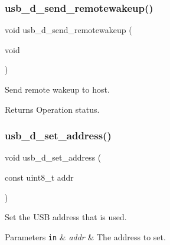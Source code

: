 \subsubsection{\texorpdfstring{usb\+\_\+d\+\_\+send\+\_\+remotewakeup()}{usb\_d\_send\_remotewakeup()}}
{\footnotesize\ttfamily void usb\+\_\+d\+\_\+send\+\_\+remotewakeup (\begin{DoxyParamCaption}\item[{void}]{ }\end{DoxyParamCaption})}



Send remote wakeup to host. 

\begin{DoxyReturn}{Returns}
Operation status. 
\end{DoxyReturn}
\mbox{\label{group__doc__driver__hal__usb__device_ga78b6a8341934ab15fe13c731b4134385}} 
\subsubsection{\texorpdfstring{usb\+\_\+d\+\_\+set\+\_\+address()}{usb\_d\_set\_address()}}
{\footnotesize\ttfamily void usb\+\_\+d\+\_\+set\+\_\+address (\begin{DoxyParamCaption}\item[{const uint8\+\_\+t}]{addr }\end{DoxyParamCaption})}



Set the U\+SB address that is used. 


\begin{DoxyParams}[1]{Parameters}
\mbox{\tt in}  & {\em addr} & The address to set. \\
\hline
\end{DoxyParams}
